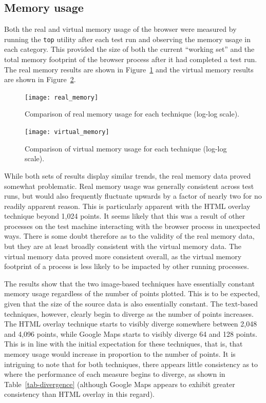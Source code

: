 \documentclass[acmnow]{acmtrans2m}
\begin{document}
\subsection{Memory usage}

Both the real and virtual memory usage of the browser were measured by
running the \texttt{top} utility after each test run and observing the
memory usage in each category. This provided the size of both the
current ``working set'' and the total memory footprint of the browser
process after it had completed a test run. The real memory results are
shown in Figure~\ref{fig-real-memory} and the virtual memory results are
shown in Figure~\ref{fig-virtual-memory}.


\begin{figure}
	\centering
	\texttt{[image: real\_memory]}
	\caption{Comparison of real memory usage for each technique (log-log scale).}
	\label{fig-real-memory}
\end{figure}


\begin{figure}
	\centering
	\texttt{[image: virtual\_memory]}
	\caption{Comparison of virtual memory usage for each technique (log-log scale).}
	\label{fig-virtual-memory}
\end{figure}


While both sets of results display similar trends, the real memory data
proved somewhat problematic. Real memory usage was generally consistent
across test runs, but would also frequently fluctuate upwards by a
factor of nearly two for no readily apparent reason. This is
particularly apparent with the HTML overlay technique beyond 1,024
points. It seems likely that this was a result of other processes on the
test machine interacting with the browser process in unexpected ways.
There is some doubt therefore as to the validity of the real memory
data, but they are at least broadly consistent with the virtual memory
data. The virtual memory data proved more consistent overall, as the
virtual memory footprint of a process is less likely to be impacted by
other running processes.

The results show that the two image-based techniques have essentially
constant memory usage regardless of the number of points plotted. This
is to be expected, given that the size of the source data is also
essentially constant. The text-based techniques, however, clearly begin
to diverge as the number of points increases. The HTML overlay technique
starts to visibly diverge somewhere between 2,048 and 4,096 points,
while Google Maps starts to visibly diverge 64 and 128 points. This is
in line with the initial expectation for these techniques, that is, that
memory usage would increase in proportion to the number of points. It is
intriguing to note that for both techniques, there appears little
consistency as to where the performance of each measure begins to
diverge, as shown in Table~\ref{tab-divergence} (although Google Maps
appears to exhibit greater consistency than HTML overlay in this
regard).
\end{document}

